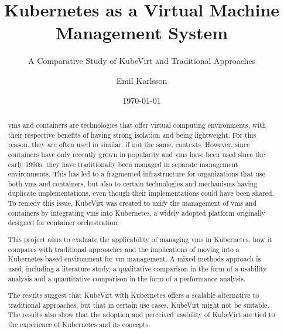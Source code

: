\documentclass{kththesis}
\title{Kubernetes as a Virtual Machine Management System}
\subtitle{A Comparative Study of KubeVirt and Traditional Approaches}
\author{Emil Karlsson}
\date{\today}
\begin{document}

\cleardoublepage

\frontmatter

\titlepage%

\begin{abstract}
    \Glspl{vm} and containers are technologies that offer virtual computing environments, with their respective benefits of having strong isolation and being lightweight. For this reason, they are often used in similar, if not the same, contexts. However, since containers have only recently grown in popularity and \Glspl{vm} have been used since the early 1990s, they have traditionally been managed in separate management environments. This has led to a fragmented infrastructure for organizations that use both \Glspl{vm} and containers, but also to certain technologies and mechanisms having duplicate implementations, even though their implementations could have been shared. To remedy this issue, KubeVirt was created to unify the management of \Glspl{vm} and containers by integrating \Glspl{vm} into Kubernetes, a widely adopted platform originally designed for container orchestration. 
    
    This project aims to evaluate the applicability of managing \Glspl{vm} in Kubernetes, how it compares with traditional approaches and the implications of moving into a Kubernetes-based environment for \Gls{vm} management. A mixed-methods approach is used, including a literature study, a qualitative comparison in the form of a usability analysis and a quantitative comparison in the form of a performance analysis. 
    
    The results suggest that KubeVirt with Kubernetes offers a scalable alternative to traditional approaches, but that in certain use cases, KubeVirt might not be suitable. The results also show that the adoption and perceived usability of KubeVirt are tied to the experience of Kubernetes and its concepts.
\end{abstract}

\cleardoublepage
\end{document}
